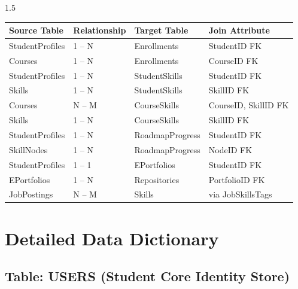 \documentclass[12pt,a4paper]{report}
\begin{document}
\begin{spacing}{1.5}
		\begin{longtable}{|p{3.5cm}|p{3.0cm}|p{3.5cm}|p{4.5cm}|}
			\hline
			\rowcolor{gray!20}\textbf{Source Table} & \textbf{Relationship} & \textbf{Target Table} & \textbf{Join Attribute} \\ \hline
			StudentProfiles & 1 -- N & Enrollments & StudentID FK \\ \hline
			Courses & 1 -- N & Enrollments & CourseID FK \\ \hline
			StudentProfiles & 1 -- N & StudentSkills & StudentID FK \\ \hline
			Skills & 1 -- N & StudentSkills & SkillID FK \\ \hline
			Courses & N -- M & CourseSkills & CourseID, SkillID FK \\ \hline
			Skills & 1 -- N & CourseSkills & SkillID FK \\ \hline
			StudentProfiles & 1 -- N & RoadmapProgress & StudentID FK \\ \hline
			SkillNodes & 1 -- N & RoadmapProgress & NodeID FK \\ \hline
			StudentProfiles & 1 -- 1 & EPortfolios & StudentID FK \\ \hline
			EPortfolios & 1 -- N & Repositories & PortfolioID FK \\ \hline
			JobPostings & N -- M & Skills & via JobSkillsTags \\ \hline
		\end{longtable}
		
		\section{Detailed Data Dictionary}
		
		\subsection{Table: USERS (Student Core Identity Store)}
		

\end{spacing}
\end{document}
